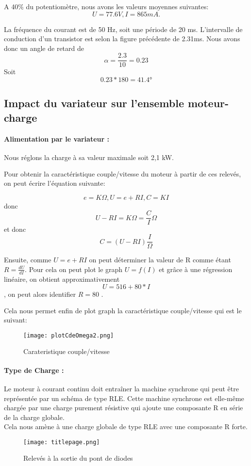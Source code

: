 \documentclass[oneside,a4paper,12pt]{article}
\begin{document}
	A 40\% du potentiomètre, nous avons les valeurs moyennes suivantes:
	$$U= 77.6 V,  I= 865 mA.$$
	
	La fréquence du courant est de 50 Hz, soit une période de 20 ms.
	L’intervalle de conduction d’un transistor est selon la figure précédente de 2.31ms. 
	Nous avons donc un angle de retard de $$\alpha=\frac{2.3}{10}=0.23$$ 
	Soit $$0.23*180 = 41.4°$$
	
	\subsection{Impact du variateur sur l’ensemble moteur-charge}
	\paragraph{Alimentation par le variateur :}
	Nous réglons la charge à sa valeur maximale soit 2,1 kW.
	
	Pour obtenir la caractéristique couple/vitesse du moteur à partir de ces relevés, on peut écrire l’équation suivante: 
	
	$$ e=K\Omega, U=e+RI, C=KI $$
	donc $$ U-RI=K\Omega=\frac{C}{I}\Omega $$
	et donc $$ C=(U-RI)\frac{I}{\Omega} $$

	Ensuite, comme $U=e+RI$ on peut déterminer la valeur de R comme étant $R=\frac{dU}{dI}$.
	Pour cela on peut plot le graph $U=f(I)$ et grâce à une régression linéaire, on obtient approximativement     
	$$U = 516 + 80*I$$, on peut alors identifier $R=80$ .
	
	Cela nous permet enfin de plot graph la caractéristique couple/vitesse qui est le suivant:
	\begin{figure}[h]
		\centering
		\texttt{[image: plotCdeOmega2.png]}
		\caption{Carateristique couple/vitesse}
	\end{figure}

	\paragraph{Type de Charge :}
	
	Le moteur à courant continu doit entraîner la machine synchrone qui peut être représentée par un schéma de type RLE. Cette machine synchrone est elle-même chargée par une charge purement résistive qui ajoute une composante R en série de la charge globale.\\
	Cela nous amène à une charge globale de type RLE avec une composante R forte.
	
	\begin{figure}[h]
		\centering
		\texttt{[image: titlepage.png]}
		\caption{Relevés à la sortie du pont de diodes}
	\end{figure}
\end{document}
